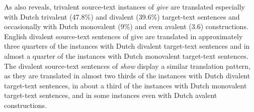 \documentclass[output=paper]{LSP/langsci}
\begin{document}
\begin{table}
     \centering
 
     \caption{Valency reduction in Dutch translations}
     \label{tab:5.5}
 
   \end{table}

As  also reveals, trivalent source-text instances of \textit{give} are translated especially with Dutch trivalent (47.8\%) and divalent (39.6\%) target-text sentences and occasionally with Dutch monovalent (9\%) and even avalent (3.6) constructions. English divalent source-text sentences of give are translated in approximately three quarters of the instances with Dutch divalent target-text sentences and in almost a quarter of the instances with Dutch monovalent target-text sentences. The divalent source-text sentences of \textit{show} display a similar translation pattern, as they are translated in almost two thirds of the instances with Dutch divalent target-text sentences, in about a third of the instances with Dutch monovalent target-text sentences, and in some instances even with Dutch avalent constructions.
\end{document}
